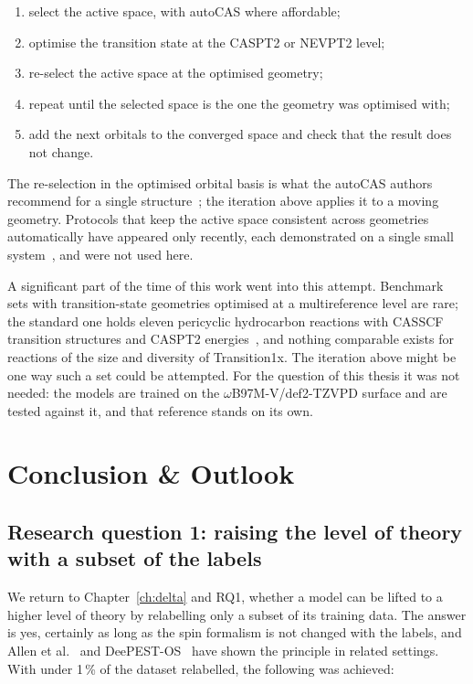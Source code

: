 \begin{enumerate}
  \item select the active space, with autoCAS where affordable;
  \item optimise the transition state at the CASPT2 or NEVPT2 level;
  \item re-select the active space at the optimised geometry;
  \item repeat until the selected space is the one the geometry was
    optimised with;
  \item add the next orbitals to the converged space and check that the
    result does not change.
\end{enumerate}

The re-selection in the optimised orbital basis is what the autoCAS
authors recommend for a single structure~\cite{stein2019autocas}; the
iteration above applies it to a moving geometry. Protocols that keep
the active space consistent across geometries automatically have
appeared only recently, each demonstrated on a single small
system~\cite{bensberg2023, seal2025wasp}, and were not used here.

A significant part of the time of this work went into this attempt.
Benchmark sets with transition-state geometries optimised at a
multireference level are rare; the standard one holds eleven
pericyclic hydrocarbon reactions with CASSCF transition structures and
CASPT2 energies~\cite{guner2003}, and nothing comparable exists for
reactions of the size and diversity of Transition1x. The iteration
above might be one way such a set could be attempted. For the question
of this thesis it was not needed: the models are trained on the \mbox{$\omega$B97M-V/def2-TZVPD}
surface and are tested against it, and that reference stands on its
own.

\chapter{Conclusion \& Outlook}
\label{ch:conclusion}

\section{Research question 1: raising the level of theory with a subset of the labels}

We return to Chapter~\ref{ch:delta} and RQ1, whether a model can be
lifted to a higher level of theory by relabelling only a subset of its
training data. The answer is yes, certainly as long as the spin
formalism is not changed with the labels, and Allen et
al.~\cite{allen2026} and DeePEST-OS~\cite{ren2026} have shown the
principle in related settings. With under 1\,\% of the dataset relabelled, the following
was achieved:

